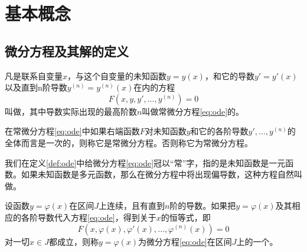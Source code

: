 \section{基本概念}
\subsection{微分方程及其解的定义}
\begin{defn}[常微分方程]\label{def:ode}
    凡是联系自变量$x$，与这个自变量的未知函数$y=y(x)$，和它的导数$y'=y'(x)$以及直到n阶导数$y^{(n)}=y^{(n)}(x)$在内的方程
    \begin{equation}\label{eq:ode}
        F(x,y,y',\ldots,y^{(n)})=0
    \end{equation}
    叫做，其中导数实际出现的最高阶数$n$叫做常微分方程\eqref{eq:ode}的。
\end{defn}

在常微分方程\eqref{eq:ode}中如果右端函数$F$对未知函数$y$和它的各阶导数$y',\ldots,y^{(n)}$的全体而言是一次的，则称它是常微分方程。否则称它为常微分方程。

我们在定义\ref{def:ode}中给微分方程\eqref{eq:ode}冠以``常''字，指的是未知函数是一元函数。如果未知函数是多元函数，那么在微分方程中将出现偏导数，这种方程自然叫做。

\begin{defn}[常微分方程的解]\label{def:odesol}
    设函数$y=\varphi(x)$在区间$J$上连续，且有直到$n$阶的导数。如果把$y=\varphi(x)$及其相应的各阶导数代入方程\eqref{eq:ode}，得到关于$x$的恒等式，即
    \begin{equation}\label{eq:odesol}
        F(x,\varphi(x),\varphi'(x),\ldots,\varphi^{(n)}(x))=0
    \end{equation}
    对一切$x\in J$都成立，则称$y=\varphi(x)$为微分方程\eqref{eq:ode}在区间$J$上的一个。
\end{defn}

